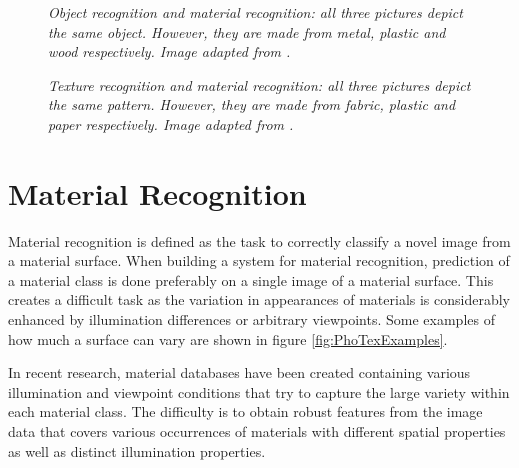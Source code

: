 \begin{figure}[htbp!]
	\begin{center}
	\end{center}
	\caption{{\it Object recognition and material recognition: all three pictures depict the same object. However, they are made from metal, plastic and wood respectively. Image adapted from \cite{ExploringFeatures}.}}
	\label{fig:ObjectRecognition}
\end{figure}

\begin{figure}[htbp!]
	\begin{center}
	\end{center}
	\caption{{\it Texture recognition and material recognition: all three pictures depict the same pattern. However, they are made from fabric, plastic and paper respectively. Image adapted from \cite{ExploringFeatures}.}}
	\label{fig:TextureRecognition}
\end{figure}

\section{Material Recognition}
Material recognition is defined as the task to correctly classify a novel image from a material surface. When building a system for material recognition, prediction of a material class is done preferably on a single image of a material surface. This creates a difficult task as the variation in appearances of materials is considerably enhanced by illumination differences or arbitrary viewpoints. Some examples of how much a surface can vary are shown in figure \ref{fig:PhoTexExamples}.

In recent research, material databases have been created containing various illumination and viewpoint conditions that try to capture the large variety within each  material class. The difficulty is to obtain robust features from the image data that covers various occurrences of materials with different spatial properties as well as distinct illumination properties. 

